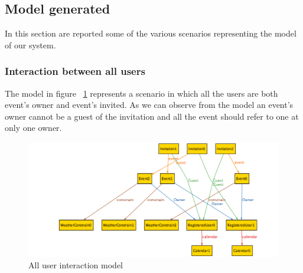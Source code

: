 \newpage
\subsection{Model generated}
In this section are reported some of the various scenarios representing the model of our system.
\subsubsection{Interaction between all users}
The model in figure ~\ref{fig:allint} represents a scenario in which all the users are both event's owner and event's invited. As we can observe from the model an  event's owner cannot be a guest of the invitation and all the event should refer to one at only one owner.
\begin{center}
 \begin{figure}[H]
    \includegraphics[width=1\textwidth,height=0.5\textwidth]{../Alloy/allInteration.png}
    \caption{All user interaction model}
     \label{fig:allint}
     \end{figure}
   \end{center} 
